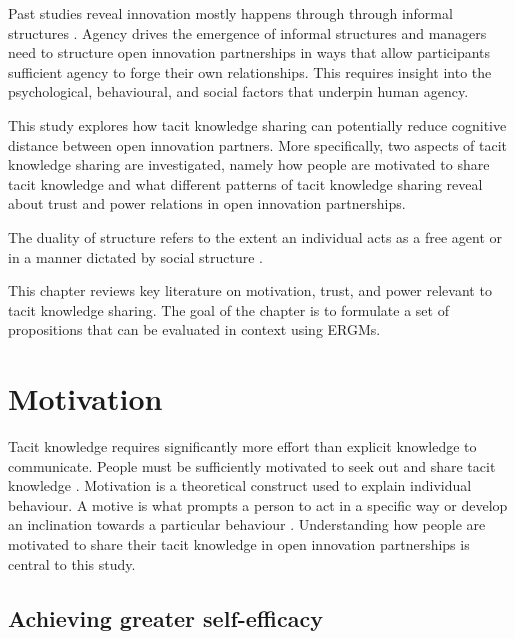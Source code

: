 Past studies reveal innovation mostly happens through through informal structures \citep{allen1977role,ibarra1993network}. Agency drives the emergence of informal structures and managers need to structure open innovation partnerships in ways that allow participants sufficient agency to forge their own relationships. This requires insight into the psychological, behavioural, and social factors that underpin human agency. \medskip

This study explores how tacit knowledge sharing can potentially reduce cognitive distance between open innovation partners. More specifically, two aspects of tacit knowledge sharing are investigated, namely how people are motivated to share tacit knowledge and what different patterns of tacit knowledge sharing reveal about trust and power relations in open innovation partnerships. 




The duality of structure refers to the extent an individual acts as a free agent or in a manner dictated by social structure \citep{giddens1984constitution}. 

This chapter reviews key literature on motivation, trust, and power relevant to tacit knowledge sharing. The goal of the chapter is to formulate a set of propositions that can be evaluated in context using ERGMs. \medskip


\section{Motivation}

Tacit knowledge requires significantly more effort than explicit knowledge to communicate. People must be sufficiently motivated to seek out and share tacit knowledge \citep{leonard1998role}. Motivation is a theoretical construct used to explain individual behaviour. A motive is what prompts a person to act in a specific way or develop an inclination towards a particular behaviour \citep{pardee1990motivation}. Understanding how people are motivated to share their tacit knowledge in open innovation partnerships is central to this study. \medskip

\subsection{Achieving greater self-efficacy}

